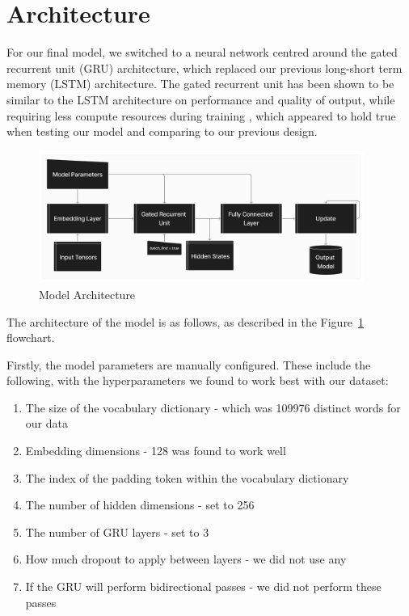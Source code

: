 \documentclass{article} %
\begin{document}
\section{Architecture}

For our final model, we switched to a neural network centred around the gated recurrent unit (GRU) architecture, which replaced our previous long-short term memory (LSTM) architecture. 
The gated recurrent unit has been shown to be similar to the LSTM architecture on performance and quality of output, while requiring less compute resources during training \citep{LSTMvGRU}, which
appeared to hold true when testing our model and comparing to our previous design. 


\begin{figure}[h]
  \begin{center}
  \includegraphics[width=0.95\textwidth]{Figs/Haiku-Generation.png}
  \end{center}
  \caption{Model Architecture}
  \label{fig:flowchart}
\end{figure}

The architecture of the model is as follows, as described in the Figure~\ref{fig:flowchart} flowchart.

Firstly, the model parameters are manually configured. These include the following, with the hyperparameters we found to work best with our dataset:

\begin{enumerate}
  \item The size of the vocabulary dictionary - which was 109976 distinct words for our data
  \item Embedding dimensions - 128 was found to work well
  \item The index of the padding token within the vocabulary dictionary
  \item The number of hidden dimensions - set to 256
  \item The number of GRU layers - set to 3
  \item How much dropout to apply between layers - we did not use any
  \item If the GRU will perform bidirectional passes - we did not perform these passes
\end{enumerate}
\end{document}
